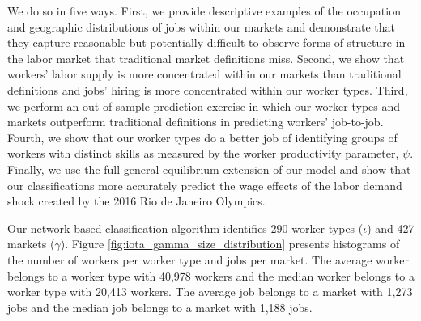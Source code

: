 \documentclass[12pt]{article}
\def\g{\gamma}
\def\i{\iota}
\theoremstyle{definition}
\theoremstyle{plain}
\begin{document}
We do so in five ways. First, we provide descriptive examples of the occupation and geographic distributions of jobs within our markets and demonstrate that they capture reasonable but potentially difficult to observe forms of structure in the labor market that traditional market definitions miss. Second, we show that workers' labor supply is more concentrated  within our markets than traditional definitions and jobs' hiring is more concentrated within our worker types. Third, we perform an out-of-sample prediction exercise in which our worker types and markets outperform traditional definitions in predicting workers' job-to-job. Fourth, we show that our worker types do a better job of identifying groups of workers with distinct skills as measured by the worker productivity parameter, $\psi$. Finally, we use the full general equilibrium extension of our model and show that our classifications more accurately predict the wage effects of the labor demand shock created by the 2016 Rio de Janeiro Olympics. 



Our network-based classification algorithm identifies 290 worker types ($\i$) and 427 markets ($\g$). Figure \ref{fig:iota_gamma_size_distribution} presents histograms of the number of workers per worker type and jobs per market. The average worker belongs to a worker type with 40,978 workers and the median worker belongs to a worker type with 20,413 workers. The average job belongs to a market with 1,273 jobs and the median job belongs to a market with 1,188 jobs. 
\end{document}
